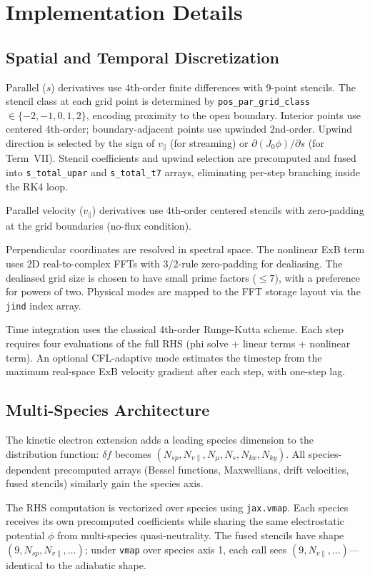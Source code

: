 \documentclass{article}
\theoremstyle{plain}
\theoremstyle{definition}
\theoremstyle{remark}
\begin{document}
\section{Implementation Details}

\subsection{Spatial and Temporal Discretization}
Parallel ($s$) derivatives use 4th-order finite differences with 9-point stencils. The stencil class at each grid point is determined by \texttt{pos\_par\_grid\_class} $\in \{-2,-1,0,1,2\}$, encoding proximity to the open boundary. Interior points use centered 4th-order; boundary-adjacent points use upwinded 2nd-order. Upwind direction is selected by the sign of $v_\parallel$ (for streaming) or $\partial(J_0\phi)/\partial s$ (for Term~VII). Stencil coefficients and upwind selection are precomputed and fused into \texttt{s\_total\_upar} and \texttt{s\_total\_t7} arrays, eliminating per-step branching inside the RK4 loop.

Parallel velocity ($v_\parallel$) derivatives use 4th-order centered stencils with zero-padding at the grid boundaries (no-flux condition).

Perpendicular coordinates are resolved in spectral space. The nonlinear ExB term uses 2D real-to-complex FFTs with 3/2-rule zero-padding for dealiasing. The dealiased grid size is chosen to have small prime factors ($\leq 7$), with a preference for powers of two. Physical modes are mapped to the FFT storage layout via the \texttt{jind} index array.

Time integration uses the classical 4th-order Runge-Kutta scheme. Each step requires four evaluations of the full RHS (phi solve + linear terms + nonlinear term). An optional CFL-adaptive mode estimates the timestep from the maximum real-space ExB velocity gradient after each step, with one-step lag.

\subsection{Multi-Species Architecture}
The kinetic electron extension adds a leading species dimension to the distribution function: $\delta f$ becomes $(N_{sp}, N_{v\parallel}, N_\mu, N_s, N_{kx}, N_{ky})$. All species-dependent precomputed arrays (Bessel functions, Maxwellians, drift velocities, fused stencils) similarly gain the species axis.

The RHS computation is vectorized over species using \texttt{jax.vmap}. Each species receives its own precomputed coefficients while sharing the same electrostatic potential $\phi$ from multi-species quasi-neutrality. The fused stencils have shape $(9, N_{sp}, N_{v\parallel}, \ldots)$; under \texttt{vmap} over species axis 1, each call sees $(9, N_{v\parallel}, \ldots)$---identical to the adiabatic shape.
\end{document}
